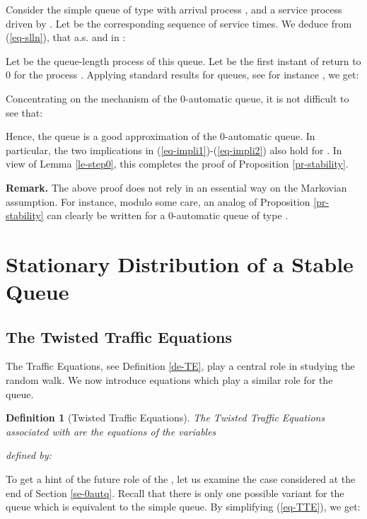\documentclass[11pt,a4paper]{article}
\newtheorem{definition}[theorem]{Definition}
\theoremstyle{remark}
\def\eref#1{(\ref{#1})}
\begin{document}
\medskip

Consider the simple queue of type  with arrival process
, and a service process driven by .
Let  be the corresponding sequence of service times.
We deduce from \eref{eq-slln}, that a.s. and in :

Let  be the
queue-length process of this queue. Let  be the
first instant of return to 0 for the process .
Applying standard results for  queues, see for
instance \cite[Prop. 4.2, Chapter X]{asmu87}, we get:


Concentrating on the mechanism of the 0-automatic queue, it is not difficult
to see that:

Hence, the queue  is a good approximation of the 0-automatic
queue. In particular, the two implications in
\eref{eq-impli1}-\eref{eq-impli2}
also hold for . In view of Lemma \ref{le-step0}, this completes the proof of Proposition
\ref{pr-stability}.


{\bf Remark.}
The above proof does not rely in an essential way on the Markovian
assumption. For instance, modulo some care,
an analog
of Proposition \ref{pr-stability} can clearly be written for a
0-automatic queue of type .


\section{Stationary Distribution of a Stable Queue}\label{se-main}

\subsection{The Twisted Traffic Equations}

The Traffic Equations, see Definition \ref{de-TE}, play a central role in studying
the random walk.
We now introduce equations which play a similar role
for the queue.


\begin{definition}[Twisted Traffic Equations]\label{de-TTE}
The {\em Twisted Traffic
  Equations } associated with 
are the
equations of the variables

defined by:

\end{definition}

To get a hint of the future role of  the ,
let us examine the case  considered at the
end of Section \ref{se-0autq}. Recall that there is only one possible
variant for the queue  which is equivalent to
the simple  queue.
By simplifying \eref{eq-TTE},
we get:
\end{document}
